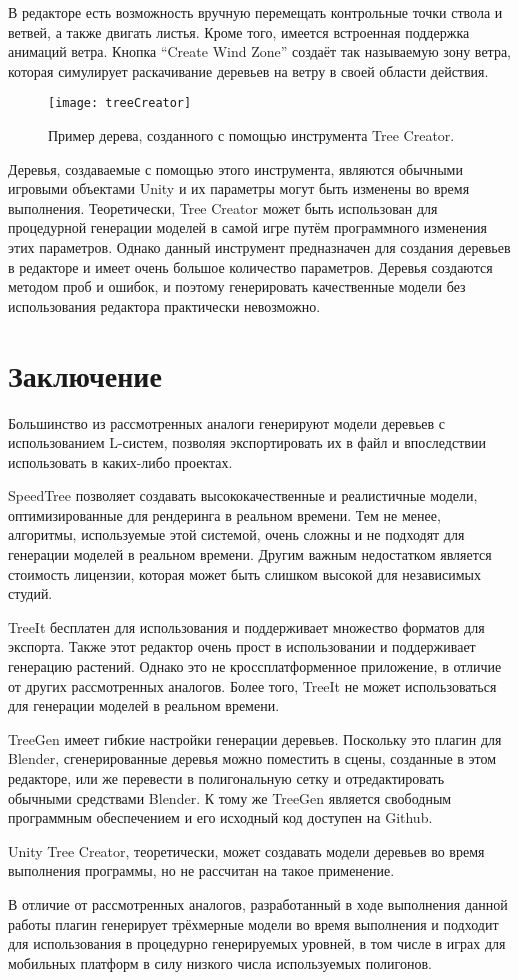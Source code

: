 В редакторе есть возможность вручную перемещать контрольные точки ствола и ветвей, а также двигать листья. Кроме того, имеется встроенная поддержка анимаций ветра. Кнопка ``Create Wind Zone'' создаёт так называемую зону ветра, которая симулирует раскачивание деревьев на ветру в своей области действия. 

\begin{figure}[h]
    \centering
    \texttt{[image: treeCreator]}
    \caption{Пример дерева, созданного с помощью инструмента Tree Creator.}
    \label{fig:treeCreator}
\end{figure}

Деревья, создаваемые с помощью этого инструмента, являются обычными игровыми объектами Unity и их параметры могут быть изменены во время выполнения. Теоретически, Tree Creator может быть использован для процедурной генерации моделей в самой игре путём программного изменения этих параметров. Однако данный инструмент предназначен для создания деревьев в редакторе и имеет очень большое количество параметров. Деревья создаются методом проб и ошибок, и поэтому генерировать качественные модели без использования редактора практически невозможно. 

\section{Заключение}
Большинство из рассмотренных аналоги генерируют модели деревьев с использованием L-систем, позволяя экспортировать их в файл и впоследствии использовать в каких-либо проектах. 

SpeedTree позволяет создавать высококачественные и реалистичные модели, оптимизированные для рендеринга в реальном времени. Тем не менее, алгоритмы, используемые этой системой, очень сложны и не подходят для генерации моделей в реальном времени. Другим важным недостатком является стоимость лицензии, которая может быть слишком высокой для независимых студий.

TreeIt бесплатен для использования и поддерживает множество форматов для экспорта. Также этот редактор очень прост в использовании и поддерживает генерацию растений. Однако это не кроссплатформенное приложение, в отличие от других рассмотренных аналогов. Более того, TreeIt не может использоваться для генерации моделей в реальном времени.

TreeGen имеет гибкие настройки генерации деревьев. Поскольку это плагин для Blender, сгенерированные деревья можно поместить в сцены, созданные в этом редакторе, или же перевести в полигональную сетку и отредактировать обычными средствами Blender. К тому же TreeGen является свободным программным обеспечением и его исходный код доступен на Github\cite{friggog}.

Unity Tree Creator, теоретически, может создавать модели деревьев во время выполнения программы, но не рассчитан на такое применение.  

В отличие от рассмотренных аналогов, разработанный в ходе выполнения данной работы плагин генерирует трёхмерные модели во время выполнения и подходит для использования в процедурно генерируемых уровней, в том числе в играх для мобильных платформ в силу низкого числа используемых полигонов.
\newpage
